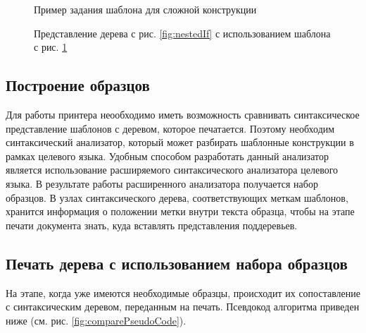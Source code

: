 \begin{figure}[h!]
	
	\caption{Пример задания шаблона для сложной конструкции}
	\label{fig:writeNestedInIf}
\end{figure}

\begin{figure}[h!]
	
	\caption{Представление дерева с рис. \ref{fig:nestedIf} с использованием шаблона с рис. \ref{fig:writeNestedInIf}}
	\label{fig:nestedIfNew}
\end{figure}

\subsection{Построение образцов}

Для работы принтера неообходимо иметь возможность сравнивать синтаксическое представление шаблонов с деревом, которое печатается. Поэтому необходим синтаксический анализатор, который может разбирать шаблонные конструкции в рамках целевого языка. Удобным способом разработать данный анализатор является использование расширяемого синтаксического анализатора целевого языка. В результате работы расширенного анализатора получается набор образцов. В узлах синтаксического дерева, соответствующих меткам шаблонов, хранится информация о положении метки внутри текста образца, чтобы на этапе печати документа знать, куда вставлять представления поддеревьев.

\newpage

\subsection{Печать дерева с использованием набора образцов}

На этапе, когда уже имеются необходимые образцы, происходит их сопоставление с синтаксическим деревом, переданным на печать.
Псевдокод алгоритма приведен ниже (см. рис. \ref{fig:comparePseudoCode}).

